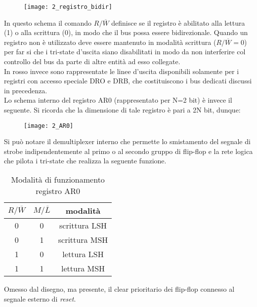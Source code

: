 \begin{figure}[H]
	\centering
	\texttt{[image: 2\_registro\_bidir]}
	\label{fig:registro_bidir}
\end{figure}
\noindent
In questo schema il comando $R/ \overline{W}$ definisce se il registro è abilitato alla lettura (1) o alla scrittura (0), in modo che il bus possa essere bidirezionale. Quando un registro non è utilizzato deve essere mantenuto in modalità scrittura ($R/ \overline{W} = 0$) per far si che i tri-state d'uscita siano disabilitati in modo da non interferire col controllo del bus da parte di altre entità ad esso collegate.
\\
In rosso invece sono rappresentate le linee d'uscita disponibili solamente per i registri con accesso speciale DRO e DRB, che costituiscono i bus dedicati discussi in precedenza.\\
Lo schema interno del registro AR0 (rappresentato per N=2 bit) è invece il seguente. Si ricorda che la dimensione di tale registro è pari a 2N bit, dunque:
\begin{figure}[H]
	\centering
	\texttt{[image: 2\_AR0]}
	\label{fig:AR0}
\end{figure}
\noindent
Si può notare il demultiplexer interno che permette lo smistamento del segnale di strobe indipendentemente al primo o al secondo gruppo di flip-flop e la rete logica che pilota i tri-state che realizza la seguente funzione.
\begin{table}[H]
	\centering
	\fontsize{10}{18}\selectfont
	\begin{tabular}{|p{5mm}|p{5mm}|p{25mm}|}
		\hline
		\multicolumn{1}{|c|}{\textit{$R/\overline{W}$}} &
		\multicolumn{1}{c|}{\textit{$M/\overline{L}$}} & 
		\multicolumn{1}{c|}{\textbf{modalità}}\\
		
		\hline
		\multicolumn{1}{|c|}{0} &
		\multicolumn{1}{|c|}{0} & 
		\multicolumn{1}{c|}{scrittura LSH}\\
		
		\hline
		\multicolumn{1}{|c|}{0} &
		\multicolumn{1}{|c|}{1} & 
		\multicolumn{1}{c|}{scrittura MSH}\\
		
		\hline
		\multicolumn{1}{|c|}{1} &
		\multicolumn{1}{|c|}{0} & 
		\multicolumn{1}{c|}{lettura LSH}\\
		
		\hline
		\multicolumn{1}{|c|}{1} &
		\multicolumn{1}{|c|}{1} & 
		\multicolumn{1}{c|}{lettura MSH}\\ \hline
	\end{tabular}
	\caption{Modalità di funzionamento registro AR0}
\end{table}
\noindent
Omesso dal disegno, ma presente, il clear prioritario dei flip-flop connesso al segnale esterno di \textit{reset}.
